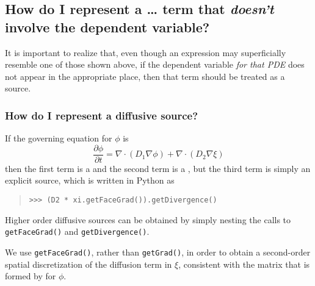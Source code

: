 \minitoc[e]
    
            \subsection{How do I represent a \dots{} term that 
            \emph{doesn't} involve the dependent variable?}
            It is important to realize that, even though an expression may
            superficially resemble one of those shown above, if the
            dependent variable \emph{for that PDE} does not appear in the
            appropriate place, then that term should be treated as a source.

                \subsubsection{How do I represent a diffusive source?}
                    If the governing equation for $\phi$ is
                    \[
                        \frac{\partial \phi}{\partial t} 
                        = \nabla\cdot\left( D_1 \nabla \phi\right)
                        + \nabla\cdot\left( D_2 \nabla \xi\right)
                    \]
                    then the first term is a  and the second term 
                    is a , but the third term is 
                    simply an explicit source, which is written in Python as
                    \begin{quote}
\begin{verbatim}
>>> (D2 * xi.getFaceGrad()).getDivergence()
\end{verbatim}
                    \end{quote}
                    Higher order diffusive sources can be obtained by
                    simply nesting the calls to \verb+getFaceGrad()+
                    and \verb+getDivergence()+.
                    \begin{reSTadmonition}[Note]
                        We use \verb|getFaceGrad()|, rather than
                        \verb|getGrad()|, in order to obtain a
                        second-order spatial discretization of the
                        diffusion term in $\xi$, consistent with the
                        matrix that is formed by
                         for $\phi$.
                    \end{reSTadmonition}

